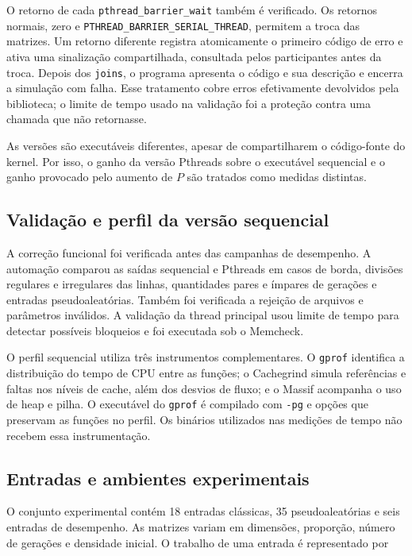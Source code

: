 \documentclass[12pt,a4paper]{article}
\begin{document}
O retorno de cada \texttt{pthread\_barrier\_wait} também é verificado. Os
retornos normais, zero e \texttt{PTHREAD\_BARRIER\_SERIAL\_THREAD}, permitem a
troca das matrizes. Um retorno diferente registra atomicamente o primeiro código
de erro e ativa uma sinalização compartilhada, consultada pelos participantes
antes da troca. Depois dos \texttt{joins}, o programa apresenta o código e sua
descrição e encerra a simulação com falha. Esse tratamento cobre erros
efetivamente devolvidos pela biblioteca; o limite de tempo usado na validação
foi a proteção contra uma chamada que não retornasse.

As versões são executáveis diferentes, apesar de compartilharem o código-fonte
do kernel. Por isso, o ganho da versão Pthreads sobre o executável sequencial e
o ganho provocado pelo aumento de $P$ são tratados como medidas distintas.

\subsection{Validação e perfil da versão sequencial}

A correção funcional foi verificada antes das campanhas de desempenho. A
automação comparou as saídas sequencial e Pthreads em casos de borda, divisões
regulares e irregulares das linhas, quantidades pares e ímpares de gerações e
entradas pseudoaleatórias. Também foi verificada a rejeição de arquivos e
parâmetros inválidos. A validação da thread principal usou limite de tempo para
detectar possíveis bloqueios e foi executada sob o Memcheck.

O perfil sequencial utiliza três instrumentos complementares. O \texttt{gprof}
identifica a distribuição do tempo de CPU entre as funções; o Cachegrind simula
referências e faltas nos níveis de cache, além dos desvios de fluxo; e o Massif
acompanha o uso de heap e pilha. O executável do \texttt{gprof} é compilado com
\texttt{-pg} e opções que preservam as funções no perfil. Os binários utilizados
nas medições de tempo não recebem essa instrumentação.

\subsection{Entradas e ambientes experimentais}

O conjunto experimental contém 18 entradas clássicas, 35 pseudoaleatórias e
seis entradas de desempenho. As matrizes variam em dimensões, proporção, número
de gerações e densidade inicial. O trabalho de uma entrada é representado por
\end{document}
